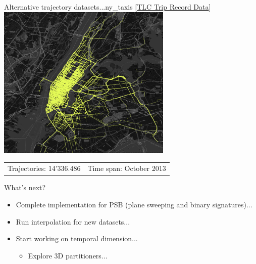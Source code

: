 \documentclass{beamer}
\begin{document}
\begin{frame}{Alternative trajectory datasets...}{ny\_taxis [\href{https://chriswhong.com/open-data/foil_nyc_taxi/}{TLC Trip Record Data}]}
    \centering
    \includegraphics[width=0.625\textwidth]{figures/ny_taxis}
    \begin{tabular}{r r}
            \small Trajectories: 14'336.486 & \small Time span: October 2013
    \end{tabular}
\end{frame}

\begin{frame}{What's next?}
  \begin{itemize}
          \item Complete implementation for PSB (plane sweeping and binary signatures)...
          \item Run interpolation for new datasets...
          \item Start working on temporal dimension...
          \begin{itemize}
                  \item Explore 3D partitioners...
          \end{itemize}
  \end{itemize}

\end{frame}
\end{document}

